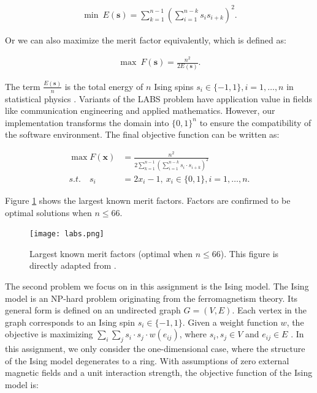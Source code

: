 \documentclass{article}
\begin{document}
\begin{align*}
    \min\ E\left( \mathbf{s} \right) = \sum_{k = 1}^{n - 1}\left( \sum_{i = 1}^{n - k} s_is_{i + k} \right)^2. 
\end{align*}

Or we can also maximize the merit factor equivalently, which is defined as:

\begin{align*}
    \max\ F\left( \mathbf{s} \right) = \frac{n^2}{2E\left( \mathbf{s} \right) }.
\end{align*}

The term $\frac{E(\mathbf{s})}{n}$ is the total energy of $n$ Ising spins $s_i\in\{-1, 1\}, i = 1, \dots, n$ in statistical physics \cite{2016packebusch}. Variants of the LABS problem have application value in fields like communication engineering and applied mathematics. However, our implementation transforms the domain into $\{0, 1\}^n$ to ensure the compatibility of the software environment. The final objective function can be written as:

\begin{align*}
    \max F(\mathbf{x}) &= \frac{n^2}{2 \sum_{k = 1}^{n - 1}\left(\sum_{i = 1}^{n - k} s_i\cdot s_{i + k}  \right)^2 }\\
    s.t.\quad s_i &= 2x_i - 1,\ x_i\in\{0, 1\}, i = 1, \dots, n.
\end{align*}

Figure \ref{fig:intro-labs} shows the largest known merit factors. Factors are confirmed to be optimal solutions when $n \leq 66$.

\begin{figure}[!ht]
 \begin{center}    
     \texttt{[image: labs.png]}
 \end{center}
 \caption{Largest known merit factors (optimal when $n \leq 66$). This figure is directly adapted from \cite{2016packebusch}.}
 \label{fig:intro-labs}
\end{figure}

The second problem we focus on in this assignment is the Ising model. The Ising model is an NP-hard problem originating from the ferromagnetism theory. Its general form is defined on an undirected graph $G = \left( V, E \right) $. Each vertex in the graph corresponds to an Ising spin $s_i\in \{-1, 1\}$. Given a weight function $w$, the objective is maximizing $\sum_i\sum_j s_i\cdot s_j \cdot w(e_{ij})$, where $s_i, s_j\in V$ and $e_{ij}\in E$ \cite{2004briest}. In this assignment, we only consider the one-dimensional case, where the structure of the Ising model degenerates to a ring. With assumptions of zero
external magnetic fields and a unit interaction strength, the objective function of the Ising model is:
\end{document}
